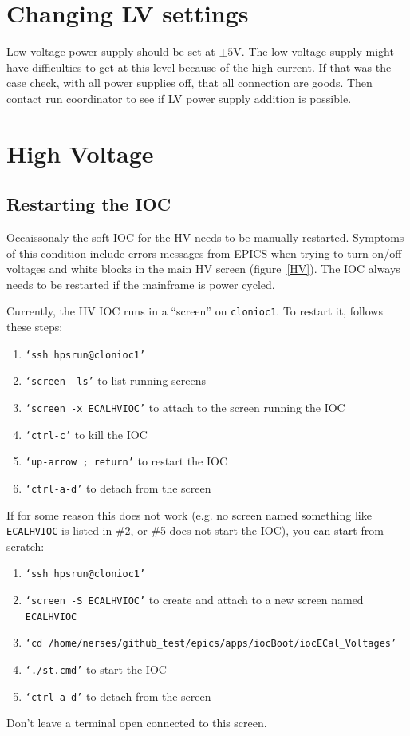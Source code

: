 \documentclass[12pt]{article}
\begin{document}
   \section{Changing LV settings}
      Low voltage power supply should be set at $\pm5$V. The low voltage supply might have difficulties to get at this level because of the high current. If that was the case check, with all power supplies off, that all connection are goods. Then contact run coordinator to see if LV power supply addition is possible. 

   \section{High Voltage}
   \subsection{Restarting the IOC}
   Occaissonaly the soft IOC for the HV needs to be manually restarted.  Symptoms of this condition include errors messages from EPICS when trying to turn on/off voltages and white blocks in the main HV screen (figure~\ref{HV}).  The IOC always needs to be restarted if the mainframe is power cycled.  
   
   Currently, the HV IOC runs in a ``screen'' on \texttt{clonioc1}.  To restart it, follows these steps:
   {\footnotesize
   \begin{enumerate}
       \item \texttt{`ssh hpsrun@clonioc1'}
       \item \texttt{`screen -ls'} to list running screens
       \item \texttt{`screen -x ECALHVIOC'} to attach to the screen running the IOC
       \item \texttt{`ctrl-c'} to kill the IOC
       \item \texttt{`up-arrow ; return'} to restart the IOC
       \item \texttt{`ctrl-a-d'} to detach from the screen
   \end{enumerate}
   }
   If for some reason this does not work (e.g. no screen named something like \texttt{ECALHVIOC} is listed in \#2, or \#5 does not start the IOC), you can start from scratch:
   {\footnotesize
   \begin{enumerate}
       \item \texttt{`ssh hpsrun@clonioc1'}
       \item \texttt{`screen -S ECALHVIOC'} to create and attach to a new screen named \texttt{ECALHVIOC}
       \item \texttt{`cd /home/nerses/github\_test/epics/apps/iocBoot/iocECal\_Voltages'}
       \item \texttt{`./st.cmd'} to start the IOC
       \item \texttt{`ctrl-a-d'} to detach from the screen
   \end{enumerate}
   }
   Don't leave a terminal open connected to this screen.
\end{document}
